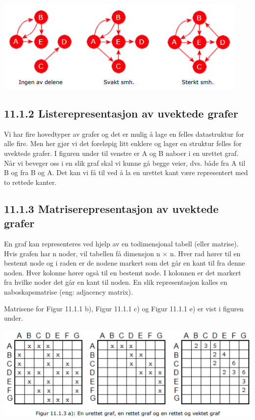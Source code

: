 \documentclass[11pt]{article}
\begin{document}
\begin{enumerate}
                    \includegraphics[center]{f-11.1.1sam.png}
            \end{enumerate}

    \subsection{11.1.2 Listerepresentasjon av uvektede grafer}
        Vi har fire hovedtyper av grafer og det er mulig å lage en felles datastruktur for alle fire. Men
        her gjør vi det foreløpig litt enklere og lager en struktur felles for uvektede grafer. I figuren
        under til venstre er A og B naboer i en urettet graf. Når vi beveger oss i en slik graf skal vi
        kunne gå begge veier, dvs. både fra A til B og fra B og A. Det kan vi få til ved å la en urettet
        kant være representert med to rettede kanter.

\newpage

    \subsection{11.1.3 Matriserepresentasjon av uvektede grafer}
        En graf kan representeres ved hjelp av en todimensjonal tabell (eller matrise). Hvis grafen
        har n noder, vil tabellen få dimensjon n × n. Hver rad hører til en bestemt node og i raden er
        de nodene markert som det går en kant til fra denne noden. Hver kolonne hører også til en
        bestemt node. I kolonnen er det markert fra hvilke noder det går en kant til noden. En slik
        representasjon kalles en naboskapsmatrise (eng: adjacency matrix).

        Matrisene for Figur 11.1.1 b), Figur 11.1.1 c) og Figur 11.1.1 e) er vist i figuren under.

        \includegraphics[center]{f-11.1.3a.png}
\end{document}
